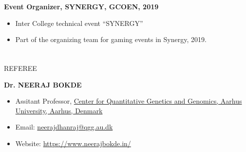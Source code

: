 \documentclass{my_cv}
\begin{document}
\begin{multicols}{2}
		\noindent
		\textbf{Event Organizer, SYNERGY, GCOEN, 2019}
		\begin{itemize}
			\item Inter College technical event “SYNERGY”
			\item Part of the organizing team for gaming events in Synergy, 2019.
		\end{itemize}
	
	\section{\faUserFriends}{REFEREE}
	
		\textbf{Dr. NEERAJ BOKDE}
		\begin{itemize}
			\item Assitant Professor, \href{http://qgg.au.dk/en/}{Center for Quantitative Genetics and Genomics, Aarhus University, Aarhus, Denmark}
			\item Email: \url{neerajdhanraj@qgg.au.dk}
			\item Website: \url{https://www.neerajbokde.in/}
		\end{itemize}
	
\end{multicols}
\end{document}
